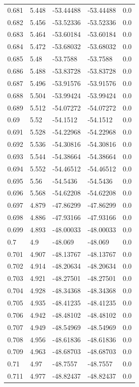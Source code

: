 \begin{tabular}{lllll}
0.681 & 5.448 & -53.44488 & -53.44488 & 0.0 \\
0.682 & 5.456 & -53.52336 & -53.52336 & 0.0 \\
0.683 & 5.464 & -53.60184 & -53.60184 & 0.0 \\
0.684 & 5.472 & -53.68032 & -53.68032 & 0.0 \\
0.685 & 5.48 & -53.7588 & -53.7588 & 0.0 \\
0.686 & 5.488 & -53.83728 & -53.83728 & 0.0 \\
0.687 & 5.496 & -53.91576 & -53.91576 & 0.0 \\
0.688 & 5.504 & -53.99424 & -53.99424 & 0.0 \\
0.689 & 5.512 & -54.07272 & -54.07272 & 0.0 \\
0.69 & 5.52 & -54.1512 & -54.1512 & 0.0 \\
0.691 & 5.528 & -54.22968 & -54.22968 & 0.0 \\
0.692 & 5.536 & -54.30816 & -54.30816 & 0.0 \\
0.693 & 5.544 & -54.38664 & -54.38664 & 0.0 \\
0.694 & 5.552 & -54.46512 & -54.46512 & 0.0 \\
0.695 & 5.56 & -54.5436 & -54.5436 & 0.0 \\
0.696 & 5.568 & -54.62208 & -54.62208 & 0.0 \\
0.697 & 4.879 & -47.86299 & -47.86299 & 0.0 \\
0.698 & 4.886 & -47.93166 & -47.93166 & 0.0 \\
0.699 & 4.893 & -48.00033 & -48.00033 & 0.0 \\
0.7 & 4.9 & -48.069 & -48.069 & 0.0 \\
0.701 & 4.907 & -48.13767 & -48.13767 & 0.0 \\
0.702 & 4.914 & -48.20634 & -48.20634 & 0.0 \\
0.703 & 4.921 & -48.27501 & -48.27501 & 0.0 \\
0.704 & 4.928 & -48.34368 & -48.34368 & 0.0 \\
0.705 & 4.935 & -48.41235 & -48.41235 & 0.0 \\
0.706 & 4.942 & -48.48102 & -48.48102 & 0.0 \\
0.707 & 4.949 & -48.54969 & -48.54969 & 0.0 \\
0.708 & 4.956 & -48.61836 & -48.61836 & 0.0 \\
0.709 & 4.963 & -48.68703 & -48.68703 & 0.0 \\
0.71 & 4.97 & -48.7557 & -48.7557 & 0.0 \\
0.711 & 4.977 & -48.82437 & -48.82437 & 0.0 \\

\end{tabular}

